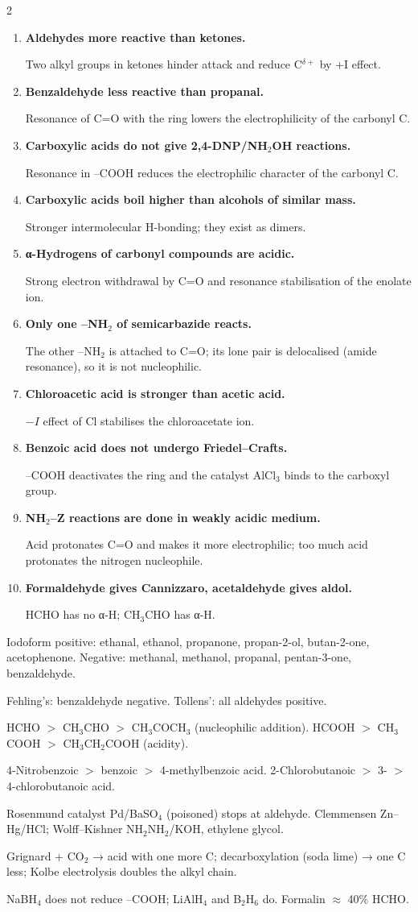 \documentclass[10pt,a4paper]{extarticle}
\newenvironment{rqlist}{\begin{enumerate}[leftmargin=12pt,label={\sffamily\bfseries\scriptsize\color{uc}\arabic*.},itemsep=1pt]}{\end{enumerate}}
\newcommand{\ans}{\par\hspace*{2pt}{\color{uc}$\hookrightarrow$}\;}
\begin{document}
\begin{multicols}{2}
\begin{rqlist}
\item \textbf{Aldehydes more reactive than ketones.}\ans Two alkyl groups in ketones hinder attack and reduce C$^{\delta+}$ by +I effect.
\item \textbf{Benzaldehyde less reactive than propanal.}\ans Resonance of C=O with the ring lowers the electrophilicity of the carbonyl C.
\item \textbf{Carboxylic acids do not give 2,4-DNP/NH$_2$OH reactions.}\ans Resonance in --COOH reduces the electrophilic character of the carbonyl C.
\item \textbf{Carboxylic acids boil higher than alcohols of similar mass.}\ans Stronger intermolecular H-bonding; they exist as dimers.
\item \textbf{α-Hydrogens of carbonyl compounds are acidic.}\ans Strong electron withdrawal by C=O and resonance stabilisation of the enolate ion.
\item \textbf{Only one --NH$_2$ of semicarbazide reacts.}\ans The other --NH$_2$ is attached to C=O; its lone pair is delocalised (amide resonance), so it is not nucleophilic.
\item \textbf{Chloroacetic acid is stronger than acetic acid.}\ans $-I$ effect of Cl stabilises the chloroacetate ion.
\item \textbf{Benzoic acid does not undergo Friedel--Crafts.}\ans --COOH deactivates the ring and the catalyst AlCl$_3$ binds to the carboxyl group.
\item \textbf{NH$_2$--Z reactions are done in weakly acidic medium.}\ans Acid protonates C=O and makes it more electrophilic; too much acid protonates the nitrogen nucleophile.
\item \textbf{Formaldehyde gives Cannizzaro, acetaldehyde gives aldol.}\ans HCHO has no α-H; CH$_3$CHO has α-H.
\end{rqlist}

\begin{fl}
\item Iodoform positive: ethanal, ethanol, propanone, propan-2-ol, butan-2-one, acetophenone. Negative: methanal, methanol, propanal, pentan-3-one, benzaldehyde.
\item Fehling's: benzaldehyde negative. Tollens': all aldehydes positive.
\item HCHO $>$ CH$_3$CHO $>$ CH$_3$COCH$_3$ (nucleophilic addition). HCOOH $>$ CH$_3$COOH $>$ CH$_3$CH$_2$COOH (acidity).
\item 4-Nitrobenzoic $>$ benzoic $>$ 4-methylbenzoic acid. 2-Chlorobutanoic $>$ 3- $>$ 4-chlorobutanoic acid.
\item Rosenmund catalyst Pd/BaSO$_4$ (poisoned) stops at aldehyde. Clemmensen Zn--Hg/HCl; Wolff--Kishner NH$_2$NH$_2$/KOH, ethylene glycol.
\item Grignard + CO$_2$ → acid with one more C; decarboxylation (soda lime) → one C less; Kolbe electrolysis doubles the alkyl chain.
\item NaBH$_4$ does not reduce --COOH; LiAlH$_4$ and B$_2$H$_6$ do. Formalin $\approx$ 40\% HCHO.
\end{fl}


\end{multicols}
\end{document}
